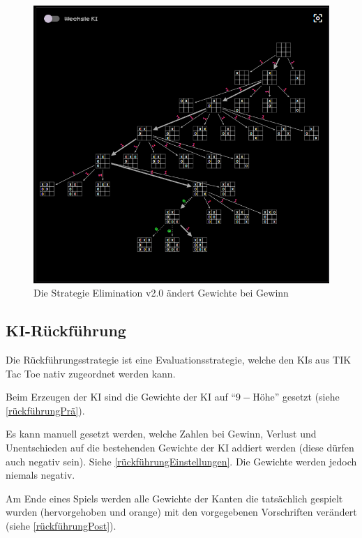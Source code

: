 \documentclass[titlepage]{scrartcl}
\newcommand{\TicTacToe}{TI\reflectbox K Tac Toe}
\begin{document}
\begin{figure}[htb]
\includegraphics[width = \linewidth]{elimination2.png}
\caption{Die Strategie Elimination v2.0 ändert Gewichte bei Gewinn}
\label{elimination2}
\end{figure}

\pagebreak

\subsection{KI-Rückführung}
Die Rückführungsstrategie ist eine Evaluationsstrategie, welche den KIs aus \TicTacToe{} nativ zugeordnet werden kann.

Beim Erzeugen der KI sind die Gewichte der KI auf "`\(9-\textrm{H\"ohe}\)"' gesetzt (siehe \ref{rückführungPrä}).

Es kann manuell gesetzt werden, welche Zahlen bei Gewinn, Verlust und Unentschieden auf die bestehenden Gewichte der KI addiert werden (diese dürfen auch negativ sein).
Siehe \ref{rückführungEinstellungen}.
Die Gewichte werden jedoch niemals negativ.

Am Ende eines Spiels werden alle Gewichte der Kanten die tatsächlich gespielt wurden (hervorgehoben und orange) mit den vorgegebenen Vorschriften verändert (siehe \ref{rückführungPost}).
\end{document}
